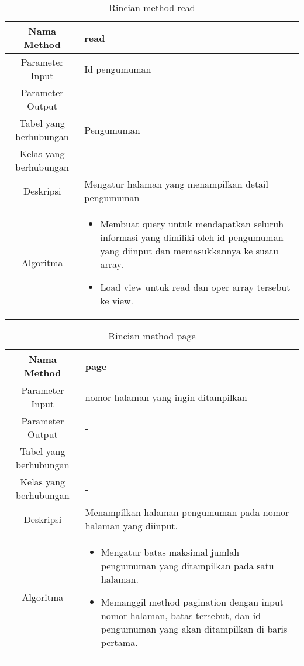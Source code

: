\begin{center}
	\begin{table}[H]
	\caption{Rincian method read}
	\label{table:pengumuman-read}
\begin{tabular}{|c|p{11cm}|}
\hline
Nama Method 	& 	 read	\\
\hline
Parameter Input & Id pengumuman \\
\hline
Parameter Output & - \\
\hline
Tabel yang berhubungan & Pengumuman \\
\hline
Kelas yang berhubungan & - \\
\hline
Deskripsi	& Mengatur halaman yang menampilkan detail pengumuman\\
\hline
Algoritma	& \begin{itemize}
				\item Membuat query untuk mendapatkan seluruh informasi yang dimiliki oleh id pengumuman yang diinput dan memasukkannya ke suatu array.
				\item Load view untuk read dan oper array tersebut ke view.
				\end{itemize} \\
\hline
\end{tabular}
\end{table}
\end{center}

\begin{center}
	\begin{table}[H]
	\caption{Rincian method page}
	\label{table:pengumuman-page}
\begin{tabular}{|c|p{11cm}|}
\hline
Nama Method 	& 	 page	\\
\hline
Parameter Input & nomor halaman yang ingin ditampilkan \\
\hline
Parameter Output & - \\
\hline
Tabel yang berhubungan & -\\
\hline
Kelas yang berhubungan & - \\
\hline
Deskripsi	& Menampilkan halaman pengumuman pada nomor halaman yang diinput.\\
\hline
Algoritma	& \begin{itemize}
				\item Mengatur batas maksimal jumlah pengumuman yang ditampilkan pada satu halaman.
				\item Memanggil method pagination dengan input nomor halaman, batas tersebut, dan id pengumuman yang akan ditampilkan di baris pertama.
				\end{itemize} \\
\hline
\end{tabular}
\end{table}
\end{center}

